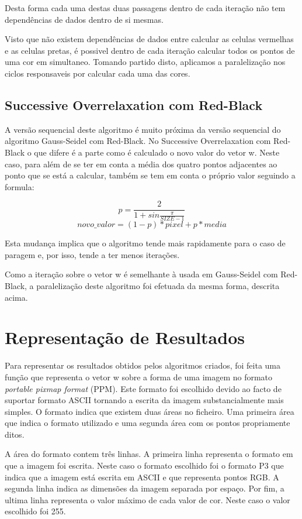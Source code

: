 \documentclass[a4paper]{report}
\begin{document}
Desta forma cada uma destas duas passagens dentro de cada iteração não tem
dependências de dados dentro de si mesmas.

Visto que não existem dependências de dados entre calcular as celulas vermelhas
e as celulas pretas, é possivel dentro de cada iteração calcular todos os pontos
de uma cor em simultaneo. Tomando partido disto, aplicamos a paralelização nos
ciclos responsaveis por calcular cada uma das cores.

\section{Successive Overrelaxation com Red-Black}

A versão sequencial deste algoritmo é muito próxima da versão sequencial do
algoritmo Gauss-Seidel com Red-Black. No Successive Overrelaxation com Red-Black
o que difere é a parte como é calculado o novo valor do vetor w. Neste caso,
para além de se ter em conta a média dos quatro pontos adjacentes ao ponto que
se está a calcular, também se tem em conta o próprio valor seguindo a formula:

\[ p = \frac{2}{1 + sin{\frac{\pi}{SIZE - 1}}} \]
\[novo\_valor = (1-p) * pixel + p * media \]

Esta mudança implica que o algoritmo tende mais rapidamente para o caso de
paragem e, por isso, tende a ter menos iterações.

Como a iteração sobre o vetor w é semelhante à usada em Gauss-Seidel com
Red-Black, a paralelização deste algoritmo foi efetuada da mesma forma, descrita
acima.

\chapter{Representação de Resultados}

Para representar os resultados obtidos pelos algoritmos criados, foi feita uma
função que representa o vetor w sobre a forma de uma imagem no formato
\textit{portable pixmap format} (PPM). Este formato foi escolhido devido ao
facto de suportar formato ASCII tornando a escrita da imagem substancialmente
mais simples. O formato indica que existem duas áreas no ficheiro. Uma primeira
área que indica o formato utilizado e uma segunda área com os pontos
propriamente ditos.

A área do formato contem três linhas. A primeira linha representa o formato em
que a imagem foi escrita. Neste caso o formato escolhido foi o formato P3 que
indica que a imagem está escrita em ASCII e que representa pontos RGB. A segunda
linha indica as dimensões da imagem separada por espaço. Por fim, a ultima linha
representa o valor máximo de cada valor de cor. Neste caso o valor escolhido
foi 255.
\end{document}

